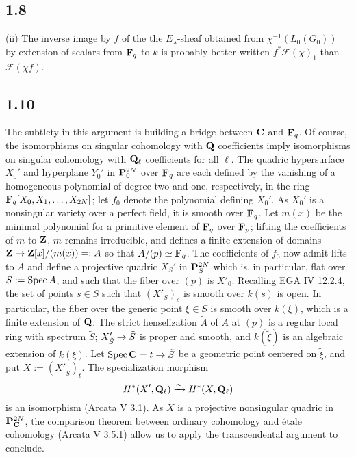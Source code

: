\documentclass[deligne.tex]{subfiles}
\begin{document}
\subsection*{1.8} (ii) The inverse image by $f$ of the the $E_\lambda$-sheaf
obtained from $\chi^{-1}(L_0(G_0))$ by extension of scalars from $\mathbf{F}_q$ to
$k$ is probably better written $f^*\mathscr F(\chi)_1$ than $\mathscr F(\chi f)$.

\subsection*{1.10} The subtlety in this argument is building a bridge 
between $\mathbf{C}$ and $\mathbf{F}_q$. Of course, the isomorphisms on singular
cohomology with $\mathbf{Q}$ coefficients imply isomorphisms on singular cohomology
with $\mathbf{Q}_\ell$ coefficients for all $\ell$.
The quadric hypersurface $X_0'$ and hyperplane $Y_0'$ in
$\mathbf{P}_0^{2N}$ over $\mathbf{F}_q$ are each defined by the vanishing of
a homogeneous polynomial of degree two and one, respectively, in the ring
$\mathbf{F}_q[X_0,X_1,\ldots,X_{2N}]$; let $f_0$ denote the polynomial defining
$X_0'$. As $X_0'$ is a nonsingular variety over a perfect field, it is
smooth over $\mathbf{F}_q$. Let $m(x)$ be the minimal polynomial for a primitive
element of $\mathbf{F}_q$ over $\mathbf{F}_p$; lifting the coefficients of $m$ to $\mathbf{Z}$,
$m$ remains irreducible, and defines a finite extension of domains
$\mathbf{Z}\rightarrow\mathbf{Z}[x]/(m(x))=:A$ so that $A/(p)\simeq\mathbf{F}_q$.
The coefficients of $f_0$ now admit lifts to $A$ and define a projective
quadric $X_S'$ in $\mathbf{P}^{2N}_S$ which is, in particular, flat over
$S:=\operatorname{Spec} A$, and such that the fiber over $(p)$ is $X'_0$.
Recalling EGA IV 12.2.4, the set of points $s\in S$ such that $(X'_S)_s$ is
smooth over $k(s)$ is open. In particular, the fiber over the generic point
$\xi\in S$ is smooth over $k(\xi)$, which is a finite extension of $\mathbf{Q}$.
The strict henselization $\tilde A$ of $A$ at $(p)$ is a regular local ring 
with spectrum $\tilde S$; $X'_{\tilde S}\rightarrow\tilde S$ is proper and smooth,
and $k(\tilde\xi)$ is an algebraic extension of $k(\xi)$.
Let $\operatorname{Spec}\mathbf{C}=t\rightarrow\tilde S$ be a geometric point centered on $\tilde\xi$,
and put $X:=(X'_{\tilde S})_t$.
The specialization morphism
\begin{equation*}
	H^*(X',\mathbf{Q}_\ell)\xrightarrow\sim H^*(X,\mathbf{Q}_\ell)
\end{equation*}
is an isomorphism (Arcata V 3.1). As $X$ is a projective nonsingular quadric
in $\mathbf{P}^{2N}_{\mathbf{C}}$, the comparison theorem between ordinary cohomology and 
étale cohomology (Arcata V 3.5.1) allow us to apply the transcendental
argument to conclude.
\end{document}
